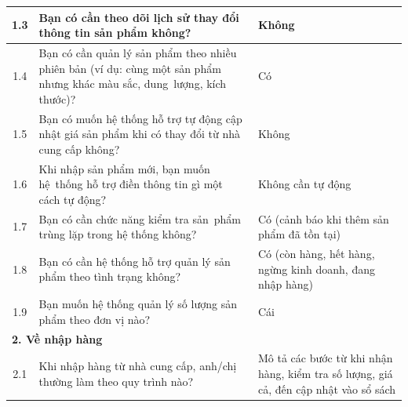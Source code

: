 \documentclass[a4paper,12pt]{report}
\begin{document}
\begin{longtable}{|c|p{8cm}|p{7cm}|}
    \hline
    1.3          & Bạn có cần theo dõi lịch sử thay đổi thông tin sản phẩm không?                                                          & Không                                                                                                                    \\
    \hline
    1.4          & Bạn có cần quản lý sản phẩm theo nhiều phiên bản (ví dụ: cùng một sản phẩm nhưng khác màu sắc, dung~lượng, kích thước)? & Có                                                                                                                       \\
    \hline
    1.5          & Bạn có muốn hệ thống hỗ trợ tự động cập nhật giá sản phẩm khi có thay đổi từ nhà cung cấp không?                        & Không                                                                                                                    \\
    \hline
    1.6          & Khi nhập sản phẩm mới, bạn muốn hệ~thống hỗ trợ điền thông tin gì một cách tự động?                                     & Không cần tự động                                                                                                        \\
    \hline
    1.7          & Bạn có cần chức năng kiểm tra sản~phẩm trùng lặp trong hệ thống không?                                                  & Có (cảnh báo khi thêm sản phẩm đã tồn tại)                                                                               \\
    \hline
    1.8          & Bạn có cần hệ thống hỗ trợ quản lý sản phẩm theo tình trạng không?                                                      & Có (còn hàng, hết hàng, ngừng kinh doanh, đang nhập hàng)                                                                \\
    \hline
    1.9          & Bạn muốn hệ thống quản lý số lượng sản phẩm theo đơn vị nào?                                                            & Cái                                                                                                                      \\
    \hline
    \multicolumn{3}{|l|}{\textbf{2. Về nhập hàng}}                                                                                                                                                                                                                    \\
    \hline
    2.1          & Khi nhập hàng từ nhà cung cấp, anh/chị thường làm theo quy trình nào?                                                   & Mô tả các bước từ khi nhận hàng, kiểm tra số lượng, giá cả, đến cập nhật vào sổ sách                                    \\

\end{longtable}
\end{document}
